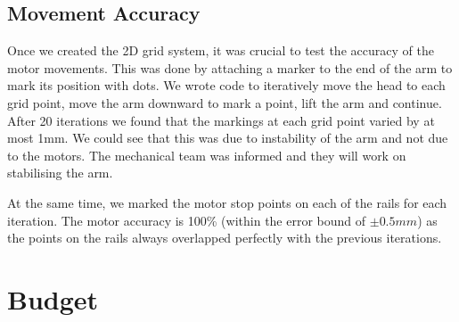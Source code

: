 \documentclass{article}
\begin{document}
\subsection{Movement Accuracy}

Once we created the 2D grid system, it was crucial to test the accuracy of the motor movements. This was done by attaching a marker to the end of the arm to mark its position with dots. We wrote code to iteratively move the head to each grid point, move the arm downward to mark a point, lift the arm and continue.  After 20 iterations we found that the markings at each grid point varied by at most 1mm. We could see that this was due to instability of the arm and not due to the motors. The mechanical team was informed and they will work on stabilising the arm. 

At the same time, we marked the motor stop points on each of the rails for each iteration. The motor accuracy is 100\% (within the error bound of \( \pm 0.5 mm\)) as the points on the rails always overlapped perfectly with the previous iterations. 
\section{Budget}\label{budget_account}
\end{document}
